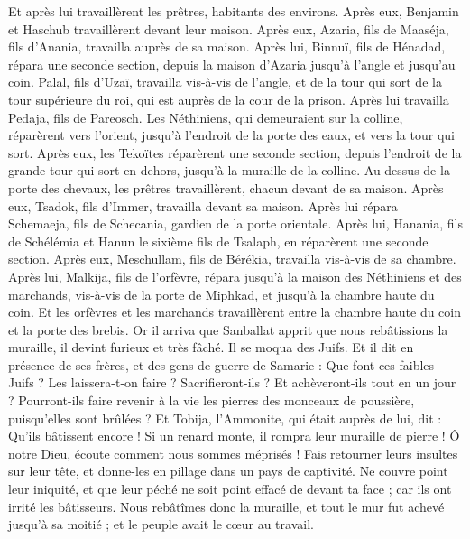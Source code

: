 \begin{multicols}{2}
Et après lui travaillèrent les prêtres, habitants des environs.
Après eux, Benjamin et Haschub travaillèrent devant leur maison. Après eux, Azaria, fils de Maaséja, fils d'Anania, travailla auprès de sa maison.
Après lui, Binnuï, fils de Hénadad, répara une seconde section, depuis la maison d'Azaria jusqu'à l'angle et jusqu'au coin.
Palal, fils d'Uzaï, travailla vis-à-vis de l'angle, et de la tour qui sort de la tour supérieure du roi, qui est auprès de la cour de la prison. Après lui travailla Pedaja, fils de Pareosch.
Les Néthiniens, qui demeuraient sur la colline, réparèrent vers l'orient, jusqu'à l'endroit de la porte des eaux, et vers la tour qui sort.
Après eux, les Tekoïtes réparèrent une seconde section, depuis l'endroit de la grande tour qui sort en dehors, jusqu'à la muraille de la colline.
Au-dessus de la porte des chevaux, les prêtres travaillèrent, chacun devant de sa maison.
Après eux, Tsadok, fils d'Immer, travailla devant sa maison. Après lui répara Schemaeja, fils de Schecania, gardien de la porte orientale.
Après lui, Hanania, fils de Schélémia et Hanun le sixième fils de Tsalaph, en réparèrent une seconde section. Après eux, Meschullam, fils de Bérékia, travailla vis-à-vis de sa chambre.
Après lui, Malkija, fils de l'orfèvre, répara jusqu'à la maison des Néthiniens et des marchands, vis-à-vis de la porte de Miphkad, et jusqu'à la chambre haute du coin.
Et les orfèvres et les marchands travaillèrent entre la chambre haute du coin et la porte des brebis.
\VerseOne{}Or il arriva que Sanballat apprit que nous rebâtissions la muraille, il devint furieux et très fâché. Il se moqua des Juifs.
Et il dit en présence de ses frères, et des gens de guerre de Samarie : Que font ces faibles Juifs ? Les laissera-t-on faire ? Sacrifieront-ils ? Et achèveront-ils tout en un jour ? Pourront-ils faire revenir à la vie les pierres des monceaux de poussière, puisqu'elles sont brûlées ?
Et Tobija, l'Ammonite, qui était auprès de lui, dit : Qu'ils bâtissent encore ! Si un renard monte, il rompra leur muraille de pierre !
Ô notre Dieu, écoute comment nous sommes méprisés ! Fais retourner leurs insultes sur leur tête, et donne-les en pillage dans un pays de captivité.
Ne couvre point leur iniquité, et que leur péché ne soit point effacé de devant ta face ; car ils ont irrité les bâtisseurs.
Nous rebâtîmes donc la muraille, et tout le mur fut achevé jusqu'à sa moitié ; et le peuple avait le cœur au travail.

\end{multicols}
